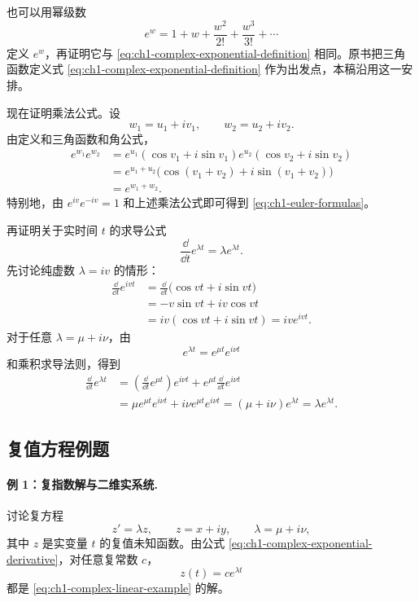 也可以用幂级数
\begin{equation}
 e^w=1+w+\frac{w^2}{2!}+\frac{w^3}{3!}+\cdots
 \label{eq:ch1-complex-exponential-series}
\end{equation}
定义 \(e^w\)，再证明它与 \eqref{eq:ch1-complex-exponential-definition} 相同。原书把三角函数定义式 \eqref{eq:ch1-complex-exponential-definition} 作为出发点，本稿沿用这一安排。

现在证明乘法公式。设
\[
 w_1=u_1+iv_1,
 \qquad
 w_2=u_2+iv_2.
\]
由定义和三角函数和角公式，
\[
 \begin{aligned}
 e^{w_1}e^{w_2}
 &=e^{u_1}(\cos v_1+i\sin v_1)
   e^{u_2}(\cos v_2+i\sin v_2)\\
 &=e^{u_1+u_2}
   \bigl(\cos(v_1+v_2)+i\sin(v_1+v_2)\bigr)\\
 &=e^{w_1+w_2}.
 \end{aligned}
\]
特别地，由 \(e^{iv}e^{-iv}=1\) 和上述乘法公式即可得到 \eqref{eq:ch1-euler-formulas}。

再证明关于实时间 \(t\) 的求导公式
\begin{equation}
 \frac{\dd}{\dd t}e^{\lambda t}
 =\lambda e^{\lambda t}.
 \label{eq:ch1-complex-exponential-derivative}
\end{equation}
先讨论纯虚数 \(\lambda=iv\) 的情形：
\[
 \begin{aligned}
 \frac{\dd}{\dd t}e^{ivt}
 &=\frac{\dd}{\dd t}\bigl(\cos vt+i\sin vt\bigr)\\
 &=-v\sin vt+iv\cos vt\\
 &=iv(\cos vt+i\sin vt)
 =iv e^{ivt}.
 \end{aligned}
\]
对于任意 \(\lambda=\mu+i\nu\)，由
\[
 e^{\lambda t}=e^{\mu t}e^{i\nu t}
\]
和乘积求导法则，得到
\[
 \begin{aligned}
 \frac{\dd}{\dd t}e^{\lambda t}
 &=
 \left(\frac{\dd}{\dd t}e^{\mu t}\right)e^{i\nu t}
 +e^{\mu t}\frac{\dd}{\dd t}e^{i\nu t}\\
 &=\mu e^{\mu t}e^{i\nu t}
 +i\nu e^{\mu t}e^{i\nu t}
 =(\mu+i\nu)e^{\lambda t}
 =\lambda e^{\lambda t}.
 \end{aligned}
\]

\subsection{复值方程例题}

\paragraph{例 1：复指数解与二维实系统.}
讨论复方程
\begin{equation}
 z'=\lambda z,
 \qquad
 z=x+iy,
 \qquad
 \lambda=\mu+i\nu,
 \label{eq:ch1-complex-linear-example}
\end{equation}
其中 \(z\) 是实变量 \(t\) 的复值未知函数。由公式 \eqref{eq:ch1-complex-exponential-derivative}，对任意复常数 \(c\)，
\begin{equation}
 z(t)=ce^{\lambda t}
 \label{eq:ch1-complex-exponential-solution}
\end{equation}
都是 \eqref{eq:ch1-complex-linear-example} 的解。

